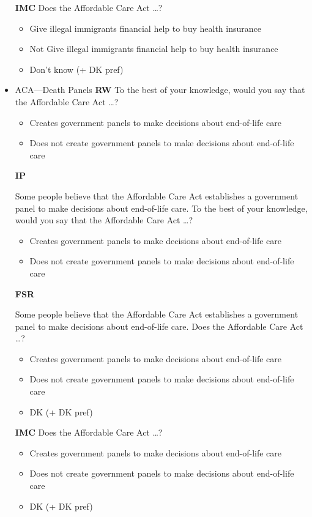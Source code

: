 \begin{itemize}
\textbf{IMC}\newline
Does the Affordable Care Act \ldots?
\begin{itemize}
	\item Give illegal immigrants financial help to buy health insurance
	\item Not Give illegal immigrants financial help to buy health insurance
	\item Don't know (+ DK pref)
\end{itemize}

\item ACA—Death Panels\newline
\textbf{RW}\newline
To the best of your knowledge, would you say that the Affordable Care Act \ldots?
\begin{itemize}
	\item Creates government panels to make decisions about end-of-life care
	\item Does not create government panels to make decisions about end-of-life care
\end{itemize}

\textbf{IP}\newline

Some people believe that the Affordable Care Act establishes a government panel to
make decisions about end-of-life care. To the best of your knowledge, would you say
that the Affordable Care Act \ldots?
\begin{itemize}
	\item Creates government panels to make decisions about end-of-life care
	\item Does not create government panels to make decisions about end-of-life care
\end{itemize}

\textbf{FSR}\newline

Some people believe that the Affordable Care Act establishes a government panel to
make decisions about end-of-life care. Does the Affordable Care Act \ldots?
\begin{itemize}
	\item Creates government panels to make decisions about end-of-life care
	\item Does not create government panels to make decisions about end-of-life care
	\item DK (+ DK pref)
\end{itemize}

\textbf{IMC}\newline
Does the Affordable Care Act \ldots?
\begin{itemize}
	\item Creates government panels to make decisions about end-of-life care
	\item Does not create government panels to make decisions about end-of-life care
	\item DK (+ DK pref)
\end{itemize}


\end{itemize}
